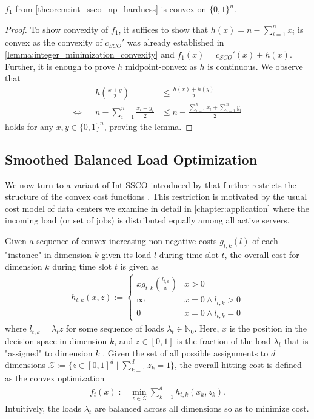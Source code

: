 \begin{lemma}
\label{lemma:ssco_reduction_convexity}
$f_1$ from \autoref{theorem:int_ssco_np_hardness} is convex on $\{0,1\}^n$.
\end{lemma}
\begin{proof}
To show convexity of $f_1$, it suffices to show that $h(x) = n - \sum_{i=1}^n x_i$ is convex as the convexity of $c_{SCO}'$ was already established in \autoref{lemma:integer_minimization_convexity} and $f_1(x) = c_{SCO}'(x) + h(x)$. Further, it is enough to prove $h$ midpoint-convex as $h$ is continuous. We observe that \begin{align*}
         &&h\left(\frac{x + y}{2}\right) &\leq \frac{h(x) + h(y)}{2} \\
    \iff &&n - \sum_{i=1}^n \frac{x_i + y_i}{2} &\leq n - \frac{\sum_{i=1}^n x_i + \sum_{i=1}^n y_i}{2}
\end{align*} holds for any $x, y \in \{0,1\}^n$, proving the lemma.
\end{proof}

\subsection{Smoothed Balanced Load Optimization}

We now turn to a variant of Int-SSCO introduced by \citeauthor*{Albers2021_2} that further restricts the structure of the convex cost functions \cite{Albers2021_2}. This restriction is motivated by the usual cost model of data centers we examine in detail in \autoref{chapter:application} where the incoming load (or set of jobs) is distributed equally among all active servers.

Given a sequence of convex increasing non-negative costs $g_{t,k}(l)$ of each "instance" in dimension $k$ given its load $l$ during time slot $t$, the overall cost for dimension $k$ during time slot $t$ is given as \begin{align*}
    h_{t,k}(x,z) := \begin{cases}
        x g_{t,k}\left(\frac{l_{t,k}}{x}\right) & x > 0 \\
        \infty                                  & x = 0 \land l_{t,k} > 0 \\
        0                                       & x = 0 \land l_{t,k} = 0
    \end{cases}
\end{align*} where $l_{t,k} = \lambda_t z$ for some sequence of loads $\lambda_t \in \mathbb{N}_0$. Here, $x$ is the position in the decision space in dimension $k$, and $z \in [0,1]$ is the fraction of the load $\lambda_t$ that is "assigned" to dimension $k$ \cite{Albers2021_2}. Given the set of all possible assignments to $d$ dimensions $\mathcal{Z} := \{z \in [0,1]^d \mid \sum_{k=1}^d z_k = 1\}$, the overall hitting cost is defined as the convex optimization \begin{align}
\label{eq:sblo_hitting_cost}
    f_t(x) := \min_{z \in \mathcal{Z}} \sum_{k=1}^d h_{t,k}(x_k,z_k).
\end{align} Intuitively, the loads $\lambda_t$ are balanced across all dimensions so as to minimize cost.

